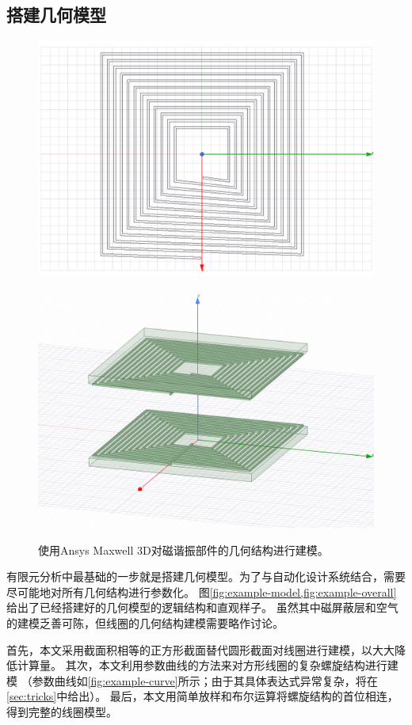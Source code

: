 \documentclass[index]{subfiles}
\begin{document}
\subsection{搭建几何模型}
\begin{figure}[h]
  \centering%
    {\includegraphics[width=0.8\linewidth]{./figures/example-curve.png}}\par
    {\includegraphics[width=0.8\linewidth]{./figures/example-overall.png}}
  \caption[几何模型的搭建]{使用Ansys Maxwell 3D对磁谐振部件的几何结构进行建模。}
\end{figure}
有限元分析中最基础的一步就是搭建几何模型。为了与自动化设计系统结合，需要尽可能地对所有几何结构进行参数化。
图\cref{fig:example-model,fig:example-overall}给出了已经搭建好的几何模型的逻辑结构和直观样子。
虽然其中磁屏蔽层和空气的建模乏善可陈，但线圈的几何结构建模需要略作讨论。

首先，本文采用截面积相等的正方形截面替代圆形截面对线圈进行建模，以大大降低计算量。
其次，本文利用参数曲线的方法来对方形线圈的复杂螺旋结构进行建模
（参数曲线如\cref{fig:example-curve}所示；由于其具体表达式异常复杂，将在\cref{sec:tricks}中给出）。
最后，本文用简单放样和布尔运算将螺旋结构的首位相连，得到完整的线圈模型。
\end{document}
